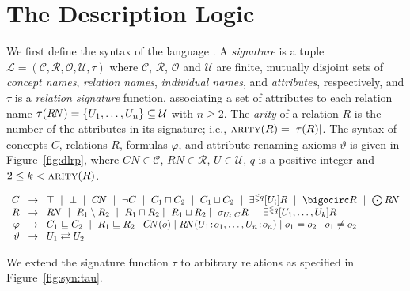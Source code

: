 \documentclass[envcountsame,draft]{llncs}
\newcommand{\greif}[1]{\ensuremath{\bigocirc#1}}
\newcommand{\lreif}[1]{\ensuremath{\bigodot#1}}
\begin{document}
\section{The Description Logic \DLRp}
\label{sec:syntax}

We first define the syntax of the language \DLRp. A \DLRp \emph{signature}
is a tuple
$\mathcal{L}=(\mathcal{C},\mathcal{R},\mathcal{O},\mathcal{U},\tau)$ 
where $\mathcal{C}$, $\mathcal{R}$, $\mathcal{O}$ and $\mathcal{U}$ are finite, 
mutually disjoint sets of 
\emph{concept names}, \emph{relation names}, \emph{individual names}, and \emph{attributes}, respectively,
and $\tau$ is a \emph{relation signature} function, associating a set of attributes to
each relation name
$\tau(R\!N)=\{U_1,\ldots,U_n\}\subseteq \mathcal{U}$ with $n\geq 2$.
The \emph{arity} of a relation $R$ is the number of the attributes in its signature; i.e., 
$\textsc{arity}(R)=\left|\tau(R)\right|$.
%
The syntax of concepts $C$, relations $R$, formulas $\varphi$, and
attribute renaming axioms $\vartheta$ is given in
Figure~\ref{fig:dlrp}, where $C\!N\in\mathcal{C}$, $R\!N\in\mathcal{R}$, 
$U\in\mathcal{U}$, 
$q$ is a positive integer and $2\leq k < \textsc{arity}(R)$. 
%
\begin{figure*}
	[t] 
	\begin{center}
		\renewcommand{\arraystretch}{1.2} $
		\begin{array}{r@{\hspace{2ex}}c@{\hspace{2ex}}l} 
			C & \to & \top\ \mid\ \bot\ \mid\ C\!N\ \mid\ \neg C\ \mid\ C_{1}\sqcap C_{2}\ \mid\ C_{1}\sqcup C_{2}\ \mid\ \EXISTR{q}{U_i} R\ \mid\ \greif{R}\ \mid\ \lreif{R\!N}\\
			R & \to & R\!N\ \mid\ R_1\setminus R_2\ \mid\ R_{1}\sqcap R_{2}\mid\ R_{1}\sqcup R_{2}\mid\ \selects{U_i}{C}{R}\ \mid\ \EXISTR{q}{U_1,\ldots,U_k} R\\
			\varphi & \to & C_1\sqsubseteq C_2\ \mid\ R_1\sqsubseteq R_2 \mid C\!N(o) \mid R\!N(U_1\!:\!o_1,\ldots,U_n\!:\!o_n) \mid o_1 = o_2 \mid o_1 \neq o_2 \\
			\vartheta & \to & U_1 \rightleftarrows U_2
		\end{array}
		$ 
		\renewcommand{\arraystretch}{1} 
	\end{center}
	\caption{\label{fig:dlrp} Syntax of \DLRp.} 
\end{figure*}
%
We extend the signature function $\tau$ to arbitrary relations as specified in Figure~\ref{fig:syn:tau}.
%
\end{document}
